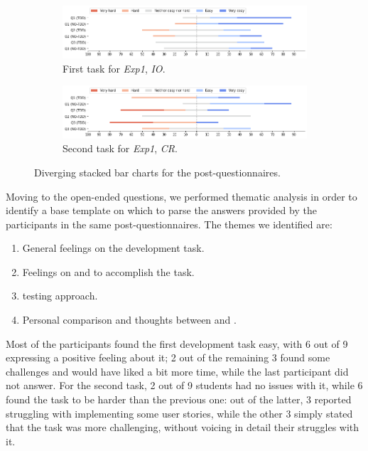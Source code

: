 \begin{figure}[htbp]
    \begin{subfigure}{\textwidth}
        \includegraphics[width=\textwidth]{figures/bar_charts/task1.png}
        \caption{First task for \textit{Exp1}, \textit{IO}.}
    \end{subfigure}
    
    \bigskip
    
    \begin{subfigure}{\textwidth}
        \includegraphics[width=\textwidth]{figures/bar_charts/task2.png}
        \caption{Second task for \textit{Exp1}, \textit{CR}.}
    \end{subfigure}
    
    \caption{Diverging stacked bar charts for the post-questionnaires.}
    \label{bar_charts}
\end{figure}

\newpage
Moving to the open-ended questions, we performed thematic analysis in order to identify a base template on which to parse the answers provided by the participants in the same post-questionnaires.
The themes we identified are:

\begin{enumerate}
    \item General feelings on the development task.
    \item Feelings on \tdd and \notdd to accomplish the task.
    \item \notdd testing approach.
    \item Personal comparison and thoughts between \tdd and \notdd.
\end{enumerate}

Most of the participants found the first development task easy, with 6 out of 9 expressing a positive feeling about it; 2 out of the remaining 3 found some challenges and would have liked a bit more time, while the last participant did not answer. 
For the second task, 2 out of 9 students had no issues with it, while 6 found the task to be harder than the previous one: out of the latter, 3 reported struggling with implementing some user stories, while the other 3 simply stated that the task was more challenging, without voicing in detail their struggles with it.


